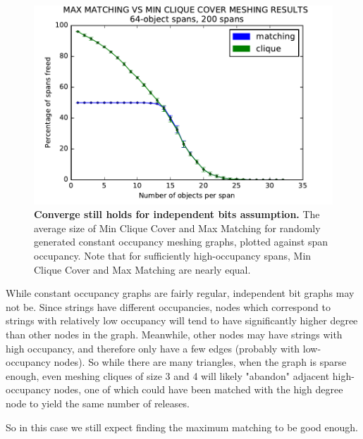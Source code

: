 \begin{figure}[h]
\includegraphics[scale = .5]{figures/ind_match_comp.pdf}
\centering
\caption{\textbf{Converge still holds for independent bits assumption.} The average size of Min Clique Cover and Max Matching for randomly generated constant occupancy meshing graphs, plotted against span occupancy.  Note that for sufficiently high-occupancy spans, Min Clique Cover and Max Matching are nearly equal.}
\label{plot:indep}
\end{figure}

While constant occupancy graphs are fairly regular, independent bit graphs may not be.  Since strings have different occupancies, nodes which correspond to strings with relatively low occupancy will tend to have significantly higher degree than other nodes in the graph.  Meanwhile, other nodes may have strings with high occupancy, and therefore only have a few edges (probably with low-occupancy nodes).  So while there are many triangles, when the graph is sparse enough, even meshing cliques of size 3 and 4 will likely "abandon" adjacent high-occupancy nodes, one of which could have been matched with the high degree node to yield the same number of releases.

So in this case we still expect finding the maximum matching to be good enough.

\iffalse
